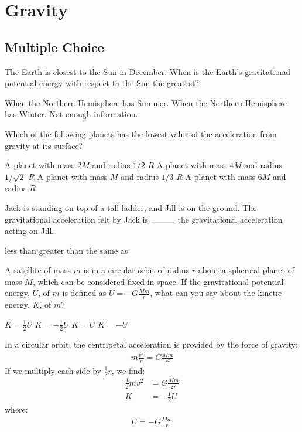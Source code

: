 \section{Gravity}

\subsection{Multiple Choice}

\question The Earth is closest to the Sun in December. When is the Earth's gravitational potential energy with respect to the Sun the greatest? 
\begin{checkboxes}
\CorrectChoice When the Northern Hemisphere has Summer. \correct
\choice When the Northern Hemisphere has Winter.
\choice Not enough information.
\end{checkboxes}

\question  Which of the following planets has the lowest value of the acceleration from gravity at its surface?
\begin{checkboxes}
\choice A planet with mass $2M$ and radius $1/2$ $R$
\choice A planet with mass $4M$ and radius $1/\sqrt{2}$ $R$
\choice A planet with mass $M$ and radius $1/3$ $R$
\CorrectChoice A planet with mass $6M$ and radius $R$ \correct
\end{checkboxes}

\question Jack is standing on top of a tall ladder, and Jill is on the ground. The gravitational acceleration felt by Jack is $\rule{1cm}{0.15mm}$ the gravitational acceleration acting on Jill. 
\begin{checkboxes}
\CorrectChoice less than \correct
\choice greater than
\choice the same as
\end{checkboxes}

\question A satellite of mass $m$ is in a circular orbit of radius $r$ about a spherical planet of mass $M$, which can be considered fixed in space. If the gravitational potential energy, $U$, of $m$ is defined as $U=-G\frac{Mm}{r}$, what can you say about the kinetic energy, $K$, of $m$?
\begin{choices} 
	\choice $K=\frac{1}{2}U$
	\CorrectChoice  $K=-\frac{1}{2}U$
	\choice  $K=U$
	\choice $K=-U$
\end{choices}
\begin{solution}
	In a circular orbit, the centripetal acceleration is provided by the force of gravity:
	\begin{align*}
	m\frac{v^2}{r}=G\frac{Mm}{r^2}
	\end{align*}
	If we multiply each side by $\frac{1}{2}r$, we find:
	\begin{align*}
	\frac{1}{2}mv^2&=G\frac{Mm}{2r}\\
	K&=-\frac{1}{2}U
	\end{align*}
	where:
	\begin{align*}
	U=-G\frac{Mm}{r}
	\end{align*}
\end{solution}

